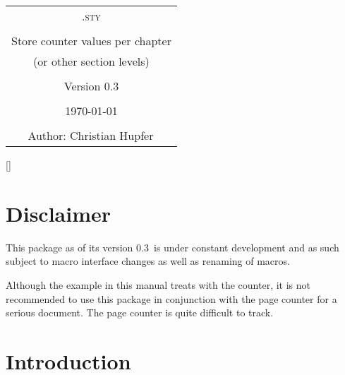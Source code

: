 \documentclass[12pt,english]{ltxdoc}
\def\packageversion{0.3}%
\newcommand{\PackageDocName}{\cpspackagename.sty}%
\begin{document}
\mmddyyyydate


\setlength{\parindent}{0pt}

\thispagestyle{empty}%

\begin{center}
\begin{tcolorbox}[boxrule=1mm,arc=4mm,colback=yellow!30!white,width=0.8\textwidth]
\large \bfseries%
\begin{center}%
\begin{tabular}{c}%
\textsc{\PackageDocName} \tabularnewline
\tabularnewline
Store counter values per chapter \tabularnewline
(or other section levels) \tabularnewline 
\tabularnewline
Version \packageversion \tabularnewline
\tabularnewline
\today \tabularnewline
\tabularnewline
\addtocounter{footnote}{2}
Author: Christian Hupfer\(^\mathrm{\fnsymbol{footnote}}\)
\tabularnewline
\end{tabular}
\end{center}
\end{tcolorbox}
\makeatletter
\renewcommand{\thefootnote}{\fnsymbol{footnote}}%
%
\makeatother

\end{center}

\tableofcontents
\clearpage




\pagestyle{scrheadings}%
\setheadsepline{2pt}[\color{blue}]

\setcounter{footnote}{0}


\section{Disclaimer}
This package as of its version \packageversion\ is under constant development and as such subject to macro interface changes as well as renaming of macros. 

Although the example in this manual treats with the  counter, it is not recommended to use this package in conjunction with the page counter for a serious document. The page counter is quite difficult to track. 

\section{Introduction}
\end{document}
